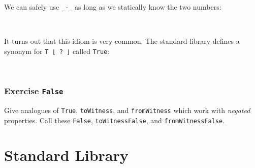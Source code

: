 We can safely use \texttt{\_-\_} as long as we statically know the two
numbers:

\begin{fence}
\begin{code}%
\>[0]\AgdaFunction{\AgdaUnderscore{}}\AgdaSpace{}%
\AgdaSymbol{:}\AgdaSpace{}%
\AgdaSpace{}%
\AgdaOperator{\AgdaFunction{-}}\AgdaSpace{}%
\AgdaSpace{}%
\AgdaSpace{}%
\<%
\\
\>[0]\AgdaSymbol{\AgdaUnderscore{}}\AgdaSpace{}%
\AgdaSymbol{=}\AgdaSpace{}%
\<%
\end{code}
\end{fence}

It turns out that this idiom is very common. The standard library
defines a synonym for \texttt{T\ ⌊\ ?\ ⌋} called \texttt{True}:

\begin{fence}
\begin{code}%
\>[0]\AgdaSpace{}%
\AgdaSymbol{:}\AgdaSpace{}%
\AgdaSpace{}%
\AgdaSymbol{\{}\AgdaSymbol{\}}\AgdaSpace{}%
\AgdaSpace{}%
\AgdaSpace{}%
\AgdaSpace{}%
\AgdaSpace{}%
\<%
\\
\>[0]\AgdaSpace{}%
\AgdaSpace{}%
\AgdaSymbol{=}\AgdaSpace{}%
\AgdaSpace{}%
\AgdaSpace{}%
\AgdaSpace{}%
\<%
\end{code}
\end{fence}

\hypertarget{exercise-false}{%
\subsubsection{\texorpdfstring{Exercise
\texttt{False}}{Exercise False}}\label{exercise-false}}

Give analogues of \texttt{True}, \texttt{toWitness}, and
\texttt{fromWitness} which work with \emph{negated} properties. Call
these \texttt{False}, \texttt{toWitnessFalse}, and
\texttt{fromWitnessFalse}.

\hypertarget{standard-library}{%
\section{Standard Library}\label{standard-library}}

